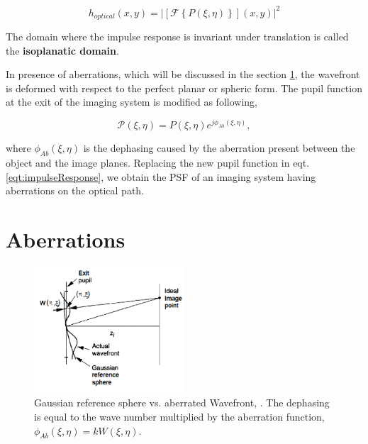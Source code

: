 \begin{equation}
h_{optical}(x,y) = |\left[\mathcal{F}\left\lbrace P(\xi,\eta) \right\rbrace\right](x,y)|^2
\label{eqt:impulseResponse}
\end{equation}

The domain where the impulse response is invariant under translation is called the \textbf{isoplanatic domain}.

In presence of aberrations, which will be discussed in the section \ref{sec:Aberrations}, the wavefront is deformed with respect to the perfect planar or spheric form. The pupil function at the exit of the imaging system is modified as following,

\begin{equation}
\mathcal{P}(\xi,\eta) = P(\xi,\eta) e^{j\phi_{Ab}(\xi,\eta)},
\label{eqt:aberratedPhasor}
\end{equation}

where $\phi_{Ab}(\xi,\eta)$ is the dephasing caused by the aberration present between the object and the image planes. Replacing the new pupil function in eqt. \eqref{eqt:impulseResponse}, we obtain the PSF of an imaging system having aberrations on the optical path.

\section{Aberrations}
\label{sec:Aberrations}

\begin{figure}
\centering
\includegraphics[width=0.5\textwidth]{Figures/AbWFvsGausSphWF}
\decoRulewrapFig
\caption[Gaussian reference sphere vs. aberrated Wavefront]{Gaussian reference sphere vs. aberrated Wavefront, \citep[Chapter 6.4]{goodman_1968}. The dephasing is equal to the wave number multiplied by the aberration function, $\phi_{Ab}(\xi,\eta) = k W(\xi,\eta)$.}
\label{fig:AbWFvsGausSphWF}
\end{figure}


